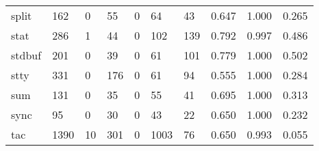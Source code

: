 \begin{longtable}{lp{2.0cm}p{2.0cm}p{2.0cm}p{2.0cm}p{2.0cm}p{2.0cm}p{2.0cm}p{2.0cm}p{2.0cm}}
split     &                    162 &                                  0 &                                55 &                                0 &                                64 &                              43 &                                0.647 &                                  1.000 &                                0.265 \\
stat      &                    286 &                                  1 &                                44 &                                0 &                               102 &                             139 &                                0.792 &                                  0.997 &                                0.486 \\
stdbuf    &                    201 &                                  0 &                                39 &                                0 &                                61 &                             101 &                                0.779 &                                  1.000 &                                0.502 \\
stty      &                    331 &                                  0 &                               176 &                                0 &                                61 &                              94 &                                0.555 &                                  1.000 &                                0.284 \\
sum       &                    131 &                                  0 &                                35 &                                0 &                                55 &                              41 &                                0.695 &                                  1.000 &                                0.313 \\
sync      &                     95 &                                  0 &                                30 &                                0 &                                43 &                              22 &                                0.650 &                                  1.000 &                                0.232 \\
tac       &                   1390 &                                 10 &                               301 &                                0 &                              1003 &                              76 &                                0.650 &                                  0.993 &                                0.055 \\

\end{longtable}
